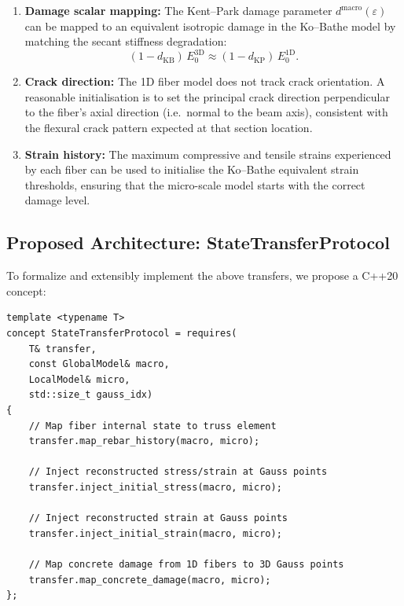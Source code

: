 \begin{enumerate}
  \item \textbf{Damage scalar mapping:}  The Kent--Park damage
    parameter $d^{\text{macro}}(\varepsilon)$ can be mapped to an
    equivalent isotropic damage in the Ko--Bathe model by matching
    the secant stiffness degradation:
    \begin{equation}
      (1 - d_{\text{KB}})\,E_0^{\text{3D}}
        \approx (1 - d_{\text{KP}})\,E_0^{\text{1D}}.
      \label{eq:damage-matching}
    \end{equation}
  \item \textbf{Crack direction:}  The 1D fiber model does not track
    crack orientation.  A reasonable initialisation is to set the
    principal crack direction perpendicular to the fiber's axial
    direction (i.e.\ normal to the beam axis), consistent with
    the flexural crack pattern expected at that section location.
  \item \textbf{Strain history:}  The maximum compressive and tensile
    strains experienced by each fiber can be used to initialise the
    Ko--Bathe equivalent strain thresholds, ensuring that the
    micro-scale model starts with the correct damage level.
\end{enumerate}

\subsection{Proposed Architecture: StateTransferProtocol}
\label{ssec:state-transfer-protocol}

To formalize and extensibly implement the above transfers, we propose
a C++20 concept:

\begin{lstlisting}
template <typename T>
concept StateTransferProtocol = requires(
    T& transfer,
    const GlobalModel& macro,
    LocalModel& micro,
    std::size_t gauss_idx)
{
    // Map fiber internal state to truss element
    transfer.map_rebar_history(macro, micro);

    // Inject reconstructed stress/strain at Gauss points
    transfer.inject_initial_stress(macro, micro);

    // Inject reconstructed strain at Gauss points
    transfer.inject_initial_strain(macro, micro);

    // Map concrete damage from 1D fibers to 3D Gauss points
    transfer.map_concrete_damage(macro, micro);
};
\end{lstlisting}

